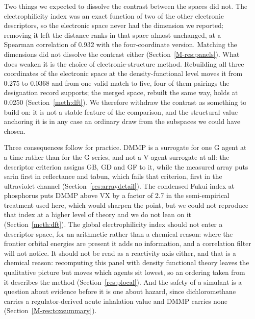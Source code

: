 \documentclass[11pt,a4paper]{article}
\begin{document}
Two things we expected to dissolve the contrast between the spaces did not. The
electrophilicity index was an exact function of two of the other electronic
descriptors, so the electronic space never had the dimension we reported;
removing it left the distance ranks in that space almost unchanged, at a
Spearman correlation of 0.932 with the four-coordinate version. Matching the
dimensions did not dissolve the contrast either (Section~\ref{M-res:panels}). What
does weaken it is the choice of electronic-structure method. Rebuilding all
three coordinates of the electronic space at the density-functional level moves
it from 0.275 to 0.0368 and from one valid match to five, four of them pairings
the designation record supports; the merged space, rebuilt the same way, holds
at 0.0250 (Section~\ref{meth:dft}). We therefore withdraw the
contrast as something to build on: it is not a stable feature of the comparison,
and the structural value anchoring it is in any case an ordinary draw from the
subspaces we could have chosen.


Three consequences follow for practice. DMMP is a surrogate for one G agent at a
time rather than for the G series, and not a V-agent surrogate at all: the
descriptor criterion assigns GB, GD and GF to it, while the measured array puts
sarin first in reflectance and tabun, which fails that criterion, first in the
ultraviolet channel (Section~\ref{res:arraydetail}). The
condensed Fukui index at phosphorus puts DMMP above VX by a factor of 2.7 in the
semi-empirical treatment used here, which would sharpen the point, but we could
not reproduce that index at a higher level of theory and we do not lean on it
(Section~\ref{meth:dft}). The global electrophilicity index
should not enter a descriptor space, for an arithmetic rather than a chemical
reason: where the frontier orbital energies are present it adds no information,
and a correlation filter will not notice. It should not be read as a reactivity
axis either, and that is a chemical reason: recomputing this panel with density
functional theory leaves the qualitative picture but moves which agents sit
lowest, so an ordering taken from it describes the method
(Section~\ref{res:plocal}). And
the safety of a simulant is a question about evidence before it is one about
hazard, since dichloromethane carries a regulator-derived acute inhalation value
and DMMP carries none (Section~\ref{M-res:toxsummary}).
\end{document}
